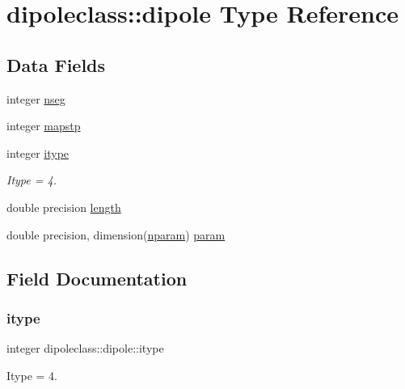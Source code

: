 \hypertarget{structdipoleclass_1_1dipole}{}\section{dipoleclass\+::dipole Type Reference}
\label{structdipoleclass_1_1dipole}
\subsection*{Data Fields}
\begin{DoxyCompactItemize}
\item 
integer \mbox{\hyperlink{structdipoleclass_1_1dipole_a5f280e96dab020ba48b5b28f47b0d5fa}{nseg}}
\item 
integer \mbox{\hyperlink{structdipoleclass_1_1dipole_af0a1da636573d6878f6d1c11d0c9e5ab}{mapstp}}
\item 
integer \mbox{\hyperlink{structdipoleclass_1_1dipole_a488890695ad6becc93db5079e740868e}{itype}}
\begin{DoxyCompactList}\small\item\em Itype = 4. \end{DoxyCompactList}\item 
double precision \mbox{\hyperlink{structdipoleclass_1_1dipole_aada668e2b218b56769c64c2ec9f21dea}{length}}
\item 
double precision, dimension(\mbox{\hyperlink{namespacedipoleclass_abc619199e1e9a2811da9e97630125da3}{nparam}}) \mbox{\hyperlink{structdipoleclass_1_1dipole_a5ce0b668334f66ce50e3852ce17ddc39}{param}}
\end{DoxyCompactItemize}


\subsection{Field Documentation}
\mbox{\label{structdipoleclass_1_1dipole_a488890695ad6becc93db5079e740868e}} 
\subsubsection{\texorpdfstring{itype}{itype}}
{\footnotesize\ttfamily integer dipoleclass\+::dipole\+::itype}



Itype = 4. 

\mbox{\label{structdipoleclass_1_1dipole_aada668e2b218b56769c64c2ec9f21dea}} 
